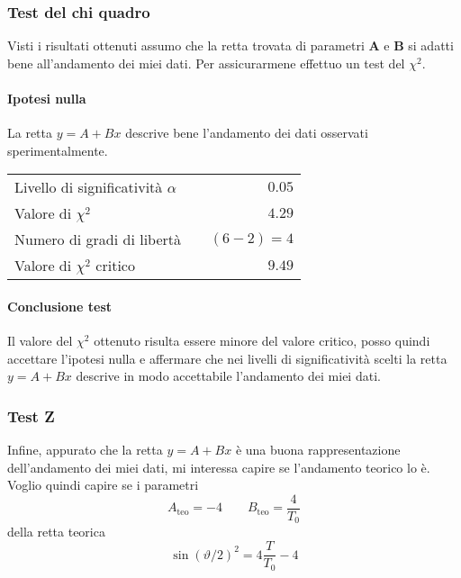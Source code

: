 \documentclass{article}
\begin{document}
	
	
	\subsubsection{Test del chi quadro}
	Visti i risultati ottenuti assumo che la retta trovata di parametri $\mathbf{A}$ e $\mathbf{B}$ si adatti bene all'andamento dei miei dati. Per assicurarmene effettuo un test del $\chi^2$.
	
	\paragraph{Ipotesi nulla} La retta $y = A + Bx$ descrive bene l'andamento dei dati osservati sperimentalmente.
	
	\vspace{0.7cm}
	\begin{table}[H]
		\centering
		\begin{tabular}{lr} 
			Livello di significatività $\alpha$		&$\quad 0.05$  \\
			Valore di $\chi ^2$             	& $\quad 4.29$       \\
			Numero di gradi di libertà      	& $\quad (6-2) = 4$         \\   
			Valore di $\chi ^2$ critico     	& $\quad 9.49$
		\end{tabular}
	\end{table}
	\vspace{0.7cm}
	
	\paragraph{Conclusione test} Il valore del $\chi^2$ ottenuto risulta essere minore del valore critico, posso quindi accettare l'ipotesi nulla e affermare che nei livelli di significatività scelti la retta $y = A + Bx$ descrive in modo accettabile l'andamento dei miei dati.
	
	\subsubsection{Test Z}
	Infine, appurato che la retta $y = A + Bx$ è una buona rappresentazione dell'andamento dei miei dati, mi interessa capire se l'andamento teorico lo è. Voglio quindi capire se i parametri 
	\[
	A_\text{teo} = -4 \qquad B_\text{teo} =  \frac{4}{T_0}
	\]
	della retta teorica
	\[
	\sin{\left(\vartheta/2\right)}^2 = 4\frac{T}{T_0} - 4
	\]
	
\end{document}

